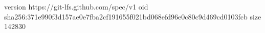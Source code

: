 version https://git-lfs.github.com/spec/v1
oid sha256:371e990f3d157ae0e7fba2cf191655f021bd068efd96e0c80c9d469cd0103fcb
size 142830
